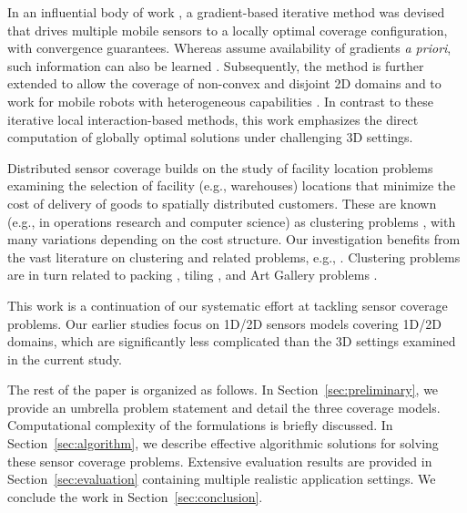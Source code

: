 In an influential body of work \cite{cortes2004coverage,martinez2007motion}, a gradient-based iterative method was devised that drives multiple mobile sensors to a locally optimal coverage configuration, with 
convergence guarantees. 
%
Whereas \cite{cortes2004coverage,martinez2007motion} assume availability of gradients {\em a priori}, such information can also be learned \cite{schwager2009decentralized}. 
%
Subsequently, the method is further extended to allow the coverage of non-convex and disjoint 2D domains \cite{schwager2009optimal} and to work for mobile robots with heterogeneous capabilities \cite{pierson2017adapting}. 
%
In contrast to these iterative local interaction-based methods, this work emphasizes the direct computation of globally optimal solutions under challenging 3D settings. 

 Distributed sensor coverage \cite{cortes2004coverage,schwager2009decentralized} builds on the study of facility location problems \cite{weber1929theory,drezner1995facility} examining the selection of facility (e.g., warehouses) locations that minimize the cost of delivery of goods to spatially distributed customers. These are known (e.g., in operations research and computer science) as clustering problems \cite{har2011geometric}, with many variations depending on the cost structure. Our investigation benefits from the vast literature on clustering and related problems, e.g., \cite{feder1988optimal,hochbaum1985best,gonzalez1985clustering,daskin2000new,shamos1975closest}.
%
Clustering problems are in turn related to packing \cite{hales2005proof}, tiling \cite{thue1910dichteste}, and Art Gallery problems \cite{o1987art,shermer1992recent}.

This work is a continuation of our systematic effort \cite{fenghangaoyu2019efficient,fengyu2020RAL,fengyu2020optimally} at tackling sensor coverage problems. Our earlier studies focus on 1D/2D sensors models covering 1D/2D domains, which are significantly less complicated than the 3D settings examined in the current study.

The rest of the paper is organized as follows. In Section~\ref{sec:preliminary}, we provide an umbrella problem statement and detail the three coverage models. Computational complexity of the formulations is briefly discussed. In Section~\ref{sec:algorithm}, we describe effective algorithmic solutions for solving these sensor coverage problems. Extensive evaluation results are provided in Section~\ref{sec:evaluation} containing multiple realistic application settings. We conclude the work in Section~\ref{sec:conclusion}.